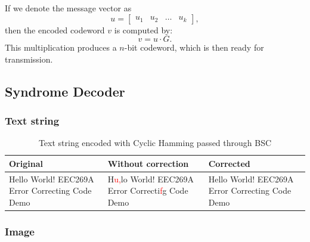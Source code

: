 \documentclass{article}
\begin{document}
If we denote the message vector as 
\begin{equation*}
    u =
        \begin{bmatrix}
        u_1 & u_2 & \dots & u_k 
        \end{bmatrix},
\end{equation*}
then the encoded codeword $v$ is computed by:
\begin{equation*}
    v = u \cdot G .
\end{equation*}
This multiplication produces a $n$-bit codeword, which is then ready for transmission.


\subsection{Syndrome Decoder}
\subsubsection{Text string}

\begin{table}[htb]
    \centering
    \caption{Text string encoded with Cyclic Hamming passed through BSC}
    \label{tab:text-cyclic-bsc}
    \renewcommand{\arraystretch}{1.5}
    \begin{tabulary}{\textwidth}{ |L|L|L| } 
    \hline
    \textbf{Original} & \textbf{Without correction} & \textbf{Corrected} \\
    \hline
    Hello World! EEC269A Error Correcting Code Demo & H\textcolor{red}{u,}lo World! EEC269A Error Correcti\textcolor{red}{f}g Code Demo & Hello World! EEC269A Error Correcting Code Demo \\
    \hline
    \end{tabulary}
\end{table}



\subsubsection{Image}
\end{document}
